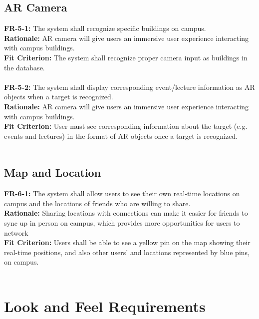 \documentclass[12pt]{article}
\begin{document}
\subsection{AR Camera}
    \textbf{FR-5-1:} The system shall recognize specific buildings on campus.\\
    \textbf{Rationale:} AR camera will give users an immersive user experience interacting with campus buildings.\\
    \textbf{Fit Criterion:} The system shall recognize proper camera input as buildings in the database.\\\\
    \textbf{FR-5-2:} The system shall display corresponding event/lecture information as AR objects when a target is recognized.\\
    \textbf{Rationale:} AR camera will give users an immersive user experience interacting with campus buildings.\\
    \textbf{Fit Criterion:} User must see corresponding information about the target (e.g. events and lectures) in the format of AR objects once a target is recognized.\\\\

\subsection{Map and Location}
    \textbf{FR-6-1:} The system shall allow users to see their own real-time locations on campus and the locations of friends who are willing to share.\\
    \textbf{Rationale:} Sharing locations with connections can make it easier for friends to sync up in person on campus, which provides more opportunities for users to network\\
    \textbf{Fit Criterion:} Users shall be able to see a yellow pin on the map showing their real-time positions, and also other users' and locations represented by blue pins, on campus.\\\\

\section{Look and Feel Requirements}
\end{document}
